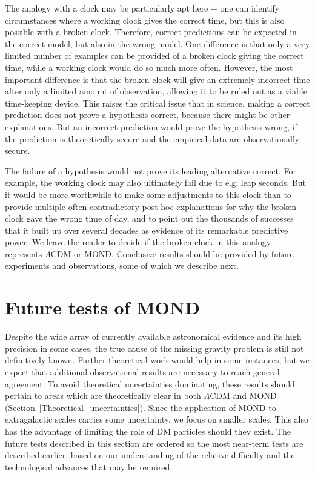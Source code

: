 \documentclass[fleqn,usenatbib,useAMS]{mnras} %
\begin{document}
The analogy with a clock may be particularly apt here $-$ one can identify circumstances where a working clock gives the correct time, but this is also possible with a broken clock. Therefore, correct predictions can be expected in the correct model, but also in the wrong model. One difference is that only a very limited number of examples can be provided of a broken clock giving the correct time, while a working clock would do so much more often. However, the most important difference is that the broken clock will give an extremely incorrect time after only a limited amount of observation, allowing it to be ruled out as a viable time-keeping device. This raises the critical issue that in science, making a correct prediction does not prove a hypothesis correct, because there might be other explanations. But an incorrect prediction would prove the hypothesis wrong, if the prediction is theoretically secure and the empirical data are observationally secure.

The failure of a hypothesis would not prove its leading alternative correct. For example, the working clock may also ultimately fail due to e.g. leap seconds. But it would be more worthwhile to make some adjustments to this clock than to provide multiple often contradictory post-hoc explanations for why the broken clock gave the wrong time of day, and to point out the thousands of successes that it built up over several decades as evidence of its remarkable predictive power. We leave the reader to decide if the broken clock in this analogy represents $\Lambda$CDM or MOND. Conclusive results should be provided by future experiments and observations, some of which we describe next.





\section{Future tests of MOND}
\label{Future_tests}

Despite the wide array of currently available astronomical evidence and its high precision in some cases, the true cause of the missing gravity problem is still not definitively known. Further theoretical work would help in some instances, but we expect that additional observational results are necessary to reach general agreement. To avoid theoretical uncertainties dominating, these results should pertain to areas which are theoretically clear in both $\Lambda$CDM and MOND (Section~\ref{Theoretical_uncertainties}). Since the application of MOND to extragalactic scales carries some uncertainty, we focus on smaller scales. This also has the advantage of limiting the role of DM particles should they exist. The future tests described in this section are ordered so the most near-term tests are described earlier, based on our understanding of the relative difficulty and the technological advances that may be required.
\end{document}
